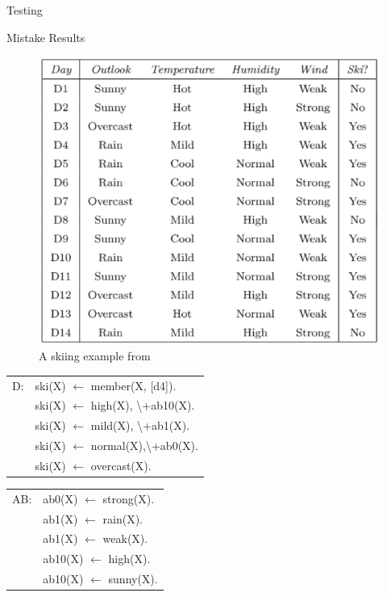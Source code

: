 \documentclass[12pt,a4paper]{article}
\begin{document}
\begin{section}{Testing}
\begin{subsection}{Mistake Results}
			\begin{figure}[H]
				\centering
				\includegraphics[scale=0.5]{img/dataset.png}
				\caption{A skiing example from \cite{cornell}}
			\end{figure}

			\begin{multicols}{2}
			\begin{table}[H]
					\begin{tabular}{rl}
					D: & ski(X) $\leftarrow$ member(X, [d4]). \\
					   & ski(X) $\leftarrow$ high(X), \textbackslash{+ab10(X)}. \\
					   & ski(X) $\leftarrow$ mild(X), \textbackslash{+ab1(X)}. \\
					   & ski(X) $\leftarrow$ normal(X),\textbackslash{+ab0(X)}. \\
					   & ski(X) $\leftarrow$ overcast(X). \\
					\end{tabular}
			\end{table}
			\columnbreak
			\begin{table}[H]
					\begin{tabular}{rl}
					AB:& ab0(X) $\leftarrow$ strong(X).\\
					   & ab1(X) $\leftarrow$ rain(X). \\
					   & ab1(X) $\leftarrow$ weak(X). \\
					   & ab10(X) $\leftarrow$ high(X). \\
					   & ab10(X) $\leftarrow$ sunny(X). \\
					\end{tabular}
			\end{table}
			\end{multicols}
		\end{subsection}
	\end{section}
\end{document}
